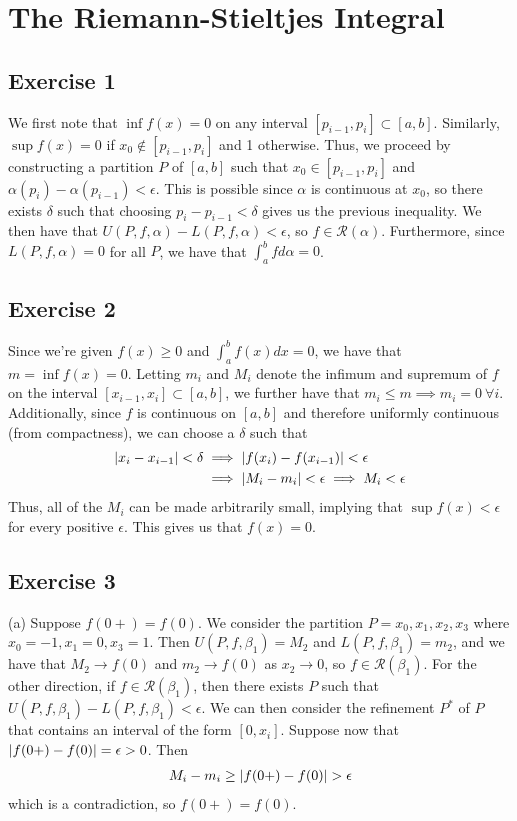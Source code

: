 \section{The Riemann-Stieltjes Integral}

\subsection{Exercise 1}
We first note that $\inf{f(x)} = 0$ on any interval $ [p_{i-1}, p_i] \subset [a, b]$. Similarly,
$\sup{f(x)} = 0$ if $x_0 \notin [p_{i-1}, p_i]$ and 1 otherwise. Thus, we proceed by constructing a
partition $P$ of $[a, b]$ such that $x_0 \in [p_{i-1}, p_i]$ and $\alpha(p_i) - \alpha(p_{i-1}) < \epsilon$.
This is possible since $\alpha$ is continuous at $x_0$, so there exists $\delta$ such that choosing
$p_i - p_{i-1} < \delta$ gives us the previous inequality. We then have that  
$U(P, f, \alpha) - L(P, f, \alpha) < \epsilon$, so $f \in \mathscr{R}(\alpha)$. Furthermore, since
$L(P, f, \alpha) = 0$ for all $P$, we have that $\int_{a}^{b} f d\alpha = 0$.

\subsection{Exercise 2}
Since we're given $f(x) \geq 0$ and $\int_{a}^{b} f(x) dx = 0$, we have that $m = \inf{f(x)} = 0$. Letting
$m_i$ and $M_i$ denote the infimum and supremum of $f$ on the interval $[x_{i-1}, x_i] \subset [a, b]$,
we further have that $m_i \leq m \implies m_i = 0 \: \forall i$. Additionally, since $f$ is continuous
on $[a, b]$ and therefore uniformly continuous (from compactness), we can choose a $\delta$ such that
\begin{align*}
        \abs{x_i - x_{i-1}} < \delta &\implies \abs{f(x_i) - f(x_{i-1})} < \epsilon \\
                                     &\implies \abs{M_i - m_i} < \epsilon \implies M_i < \epsilon
\end{align*}
Thus, all of the $M_i$ can be made arbitrarily small, implying that $\sup{f(x)} < \epsilon$ for every 
positive $\epsilon$. This gives us that $f(x) = 0$.

\subsection{Exercise 3}
(a) Suppose $f(0+) = f(0)$. We consider the partition $P = {x_0, x_1, x_2, x_3}$ where  
$x_0 = -1, x_1 = 0, x_3 = 1$. Then $U(P, f, \beta_1) = M_2$ and $L(P, f, \beta_1) = m_2$, and
we have that $M_2 \to f(0)$ and $m_2 \to f(0)$ as $x_2 \to 0$, so $f \in \mathscr{R}(\beta_1)$.
For the other direction, if $f \in \mathscr{R}(\beta_1)$, then there exists $P$ such that 
$U(P, f, \beta_1) - L(P, f, \beta_1) < \epsilon$. We can then consider the refinement $P^*$ of $P$ 
that contains an interval of the form $[0, x_i]$. Suppose now that $\abs{f(0+) - f(0)} = \epsilon > 0$.
Then
\begin{align*}
        M_i - m_i \geq \abs{f(0+) - f(0)} > \epsilon
\end{align*}
which is a contradiction, so $f(0+) = f(0)$.

